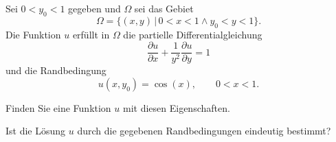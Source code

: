 Sei $0 < y_0 < 1$ gegeben und $\Omega$ sei das Gebiet
\begin{equation}
\Omega
=
\{ (x,y)\,|\,
0 < x < 1
\wedge
y_0 < y < 1
\}.
\label{30000015:gebiet}
\end{equation}
Die Funktion $u$ erfüllt in $\Omega$ die partielle Differentialgleichung
\begin{equation}
\frac{\partial u}{\partial x}
+
\frac{1}{y^2} \frac{\partial u}{\partial y}
=
1
\label{30000015:gleichung}
\end{equation}
und die Randbedingung
\[
u(x, y_0) = \cos(x), \qquad 0 < x < 1.
\]
\begin{teilaufgaben}
\item
Finden Sie eine Funktion $u$ mit diesen Eigenschaften.
\item
Ist die Lösung $u$ durch die gegebenen Randbedingungen eindeutig bestimmt?
\end{teilaufgaben}

